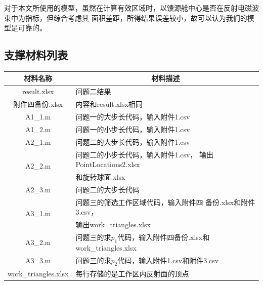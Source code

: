 \documentclass[withoutpreface,bwprint]{cumcmthesis} %
\begin{document}
对于本文所使用的模型，虽然在计算有效区域时，以馈源舱中心是否在反射电磁波束中为指标，但综合考虑其
面积差距，所得结果误差较小，故可以认为我们的模型是可靠的。

\newpage
\begin{appendices}
\section{支撑材料列表}
\begin{table}[h!]
    \centering
    \begin{tabular}{cccc}
        \toprule
        材料名称 & \multicolumn{3}{c}{材料描述}  \\
        \midrule
        result.xlsx & \multicolumn{3}{l}{问题二结果} \\
        \cmidrule{1-4}
        附件四备份.xlsx & \multicolumn{3}{l}{内容和result.xlsx相同} \\
        \cmidrule{1-4}
        A1\_1.m & \multicolumn{3}{l}{问题一的大步长代码，输入附件1.csv} \\
        \cmidrule{1-4}
        A1\_2.m & \multicolumn{3}{l}{问题一的小步长代码，输入附件1.csv} \\
        \cmidrule{1-4}
        A2\_1.m & \multicolumn{3}{l}{问题二的大步长代码，输入附件1.csv} \\
        \cmidrule{1-4}
        \multirow{2}{*}{A2\_2.m} & \multicolumn{3}{l}{问题二的小步长代码，输入附件1.csv，
                输出PointLocations2.xlsx} \\ & \multicolumn{3}{l}{和旋转球面.xlsx} \\
        \cmidrule{1-4}    
        A2\_3.m & \multicolumn{3}{l}{问题二的大步长代码} \\
        \cmidrule{1-4}
        \multirow{2}{*}{A3\_1.m} & \multicolumn{3}{l}{问题三的筛选工作区域代码，输入附件四
        备份.xlsx和附件3.csv，}\\ & \multicolumn{3}{l}{输出work\_triangles.xlsx} \\
        \cmidrule{1-4}
        A3\_2.m & \multicolumn{3}{l}{问题三的求$p_1$代码，输入附件四备份.xlsx和
                    work\_triangles.xlsx} \\
        \cmidrule{1-4}
        A3\_3.m & \multicolumn{3}{l}{问题三的求$p_2$代码，输入附件1.csv和附件3.csv} \\ 
        \cmidrule{1-4}
        work\_triangles.xlsx & \multicolumn{3}{l}{每行存储的是工作区内反射面的顶点} \\          
        \bottomrule
    \end{tabular}%
\end{table}%

\end{appendices}
\end{document}
